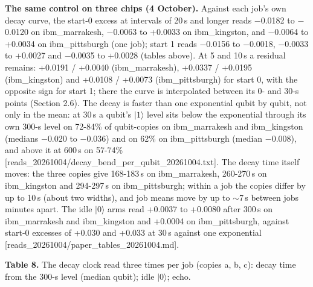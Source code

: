 \documentclass[11pt]{article}
\begin{document}
\textbf{The same control on three chips (4 October).} Against each job's own decay curve, the start-0 excess at intervals of 20\,\textmu s and longer reads \(-\)0.0182 to \(-\)0.0120 on ibm\_marrakesh, \(-\)0.0063 to +0.0033 on ibm\_kingston, and \(-\)0.0064 to +0.0034 on ibm\_pittsburgh (one job); start 1 reads \(-\)0.0156 to \(-\)0.0018, \(-\)0.0033 to +0.0027 and \(-\)0.0035 to +0.0028 (tables above). At 5 and 10\,\textmu s a residual remains: +0.0191 / +0.0040 (ibm\_marrakesh), +0.0337 / +0.0195 (ibm\_kingston) and +0.0108 / +0.0073 (ibm\_pittsburgh) for start 0, with the opposite sign for start 1; there the curve is interpolated between its 0- and 30-\textmu s points (Section 2.6). The decay is faster than one exponential qubit by qubit, not only in the mean: at 30\,\textmu s a qubit's \(|1\rangle\) level sits below the exponential through its own 300-\textmu s level on 72-84\% of qubit-copies on ibm\_marrakesh and ibm\_kingston (medians \(-\)0.020 to \(-\)0.036) and on 62\% on ibm\_pittsburgh (median \(-\)0.008), and above it at 600\,\textmu s on 57-74\% {[}reads\_20261004/decay\_bend\_per\_qubit\_20261004.txt{]}. The decay time itself moves: the three copies give 168-183\,\textmu s on ibm\_marrakesh, 260-270\,\textmu s on ibm\_kingston and 294-297\,\textmu s on ibm\_pittsburgh; within a job the copies differ by up to 10\,\textmu s (about two widths), and job means move by up to \(\sim\)7\,\textmu s between jobs minutes apart. The idle \(|0\rangle\) arms read +0.0037 to +0.0080 after 300\,\textmu s on ibm\_marrakesh and ibm\_kingston and +0.0004 on ibm\_pittsburgh, against start-0 excesses of +0.030 and +0.033 at 30\,\textmu s against one exponential {[}reads\_20261004/paper\_tables\_20261004.md{]}.

\textbf{Table 8.} The decay clock read three times per job (copies a, b, c): decay time from the 300-\textmu s level (median qubit); idle \(|0\rangle\); echo.
\end{document}
